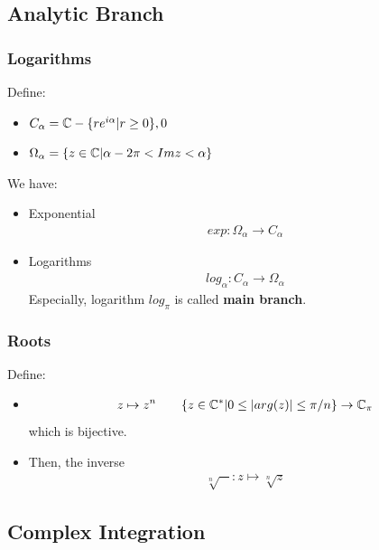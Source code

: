 \documentclass[Total.tex]{subfiles}
\begin{document}
			\subsection{Analytic Branch}
				\subsubsection{Logarithms}
					
					\begin{Def}
						Define:
						\begin{itemize}
							\item $C_\alpha=\mathbb{C}-\{re^{i\alpha}|r\geq 0\},0$
							\item $\Omega_\alpha=\{z\in \mathbb{C}|\alpha-2\pi<Im z<\alpha\}$
						\end{itemize}
						We have:
						\begin{itemize}
							\item Exponential
							\begin{gather*}
								exp:\Omega_\alpha\rightarrow C_\alpha
							\end{gather*}
							\item Logarithms
							\begin{gather*}
								log_\alpha:C_\alpha\rightarrow \Omega_\alpha
							\end{gather*}
							Especially, logarithm $log_\pi$ is called \textbf{main branch}.
						\end{itemize}
					\end{Def}
				\subsubsection{Roots}
					\begin{Def}
						Define:
						\begin{itemize}
							\item \begin{gather*}
								z\mapsto z^n\qquad \{z\in \mathbb{C}^*|0\leq |arg(z)|\leq \pi/n\}\rightarrow \mathbb{C}_\pi
							\end{gather*}
							which is bijective.
							\item  Then, the inverse
							\begin{gather*}
								\sqrt[n]{-}:z\mapsto \sqrt[n]{z}
							\end{gather*}
						\end{itemize}
					\end{Def}
			\subsection{Complex Integration}
\end{document}
